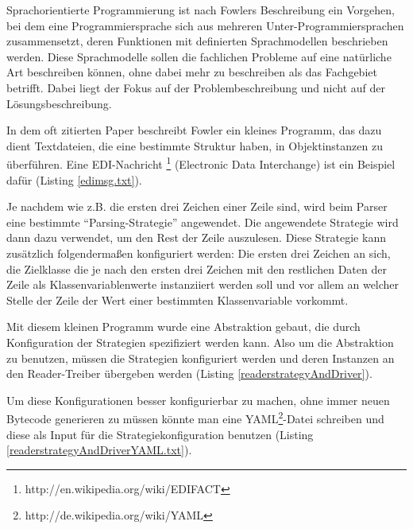 \documentclass[11pt,english,ngerman, headsepline]{scrreprt}
\begin{document}
Sprachorientierte Programmierung ist nach Fowlers Beschreibung ein Vorgehen,
bei dem eine Programmiersprache sich aus mehreren Unter-Programmiersprachen
zusammensetzt, deren Funktionen mit definierten Sprachmodellen beschrieben
werden.
Diese Sprachmodelle sollen die fachlichen Probleme auf eine
natürliche Art beschreiben können, ohne dabei mehr zu beschreiben als das
Fachgebiet betrifft. Dabei liegt der Fokus auf der Problembeschreibung und nicht
auf der Lösungsbeschreibung.

In dem oft zitierten Paper beschreibt Fowler ein kleines Programm, das dazu
dient Textdateien, die eine bestimmte Struktur haben, in Objektinstanzen zu
überführen.
Eine EDI-Nachricht \footnote{http://en.wikipedia.org/wiki/EDIFACT} (Electronic
Data Interchange) ist ein Beispiel dafür (Listing \ref{edimsg.txt}).



Je nachdem wie z.B. die ersten drei Zeichen einer Zeile sind, wird beim
Parser eine bestimmte ``Parsing-Strategie'' angewendet. 
Die angewendete Strategie\cite{gamma1995design} wird dann dazu verwendet, um den
Rest der Zeile auszulesen. Diese Strategie kann zusätzlich folgendermaßen
konfiguriert werden:
Die ersten drei Zeichen an sich, die Zielklasse die je nach den ersten drei Zeichen mit den restlichen Daten der
Zeile als Klassenvariablenwerte instanziiert werden soll und vor allem an
welcher Stelle der Zeile der Wert einer bestimmten Klassenvariable vorkommt.

Mit diesem kleinen Programm wurde eine Abstraktion gebaut, die durch
Konfiguration der Strategien spezifiziert werden kann.
Also um die Abstraktion zu benutzen, müssen die Strategien konfiguriert werden
und deren Instanzen an den Reader-Treiber übergeben werden  (Listing
\ref{readerstrategyAndDriver}).
 



Um diese Konfigurationen besser konfigurierbar zu machen, ohne immer neuen
Bytecode generieren zu müssen könnte man eine
YAML\footnote{http://de.wikipedia.org/wiki/YAML}-Datei schreiben und diese als
Input für die Strategiekonfiguration benutzen  (Listing
\ref{readerstrategyAndDriverYAML.txt}).
 

\end{document}
